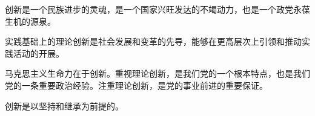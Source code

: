 {创新是一个民族进步的灵魂，是一个国家兴旺发达的不竭动力，也是一个政党永葆生机的源泉。~}

{实践基础上的理论创新是社会发展和变革的先导，能够在更高层次上引领和推动实践活动的开展。~}

{{马克思主义生命力在于创新。}重视理论创新，是我们党的一个根本特点，也是我们党的一条重要政治经验。注重理论创新，是党的事业前进的重要保证。}

{创新是以坚持和继承为前提的。}
